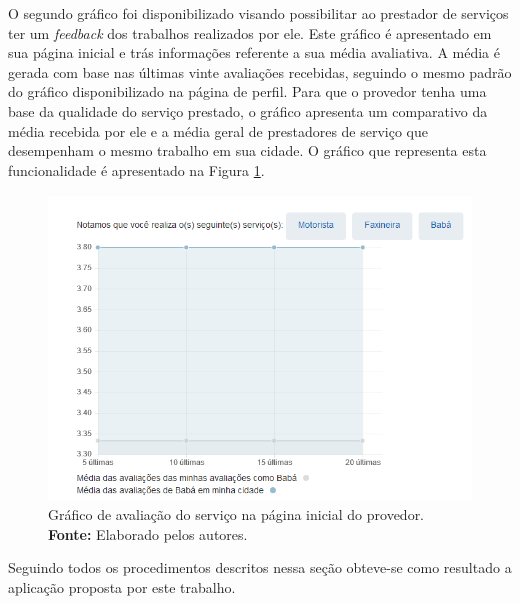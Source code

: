 \par O segundo gráfico foi disponibilizado visando possibilitar ao prestador de serviços ter um \textit{feedback} dos trabalhos realizados por ele. Este gráfico é apresentado em sua página inicial e trás informações referente a sua média avaliativa. A média é gerada com base nas últimas vinte avaliações recebidas, seguindo o mesmo padrão do gráfico disponibilizado na página de perfil. Para que o provedor tenha uma base da qualidade do serviço prestado, o gráfico apresenta um comparativo da média recebida por ele e a média geral de prestadores de serviço que desempenham o mesmo trabalho em sua cidade. O gráfico que representa esta funcionalidade é apresentado na Figura \ref{fig:grafico_pagina_inicial}.

\begin{figure}[h!]
	\centerline{\includegraphics[scale=0.65]{./imagens/grafico-pagina-inicial.png}}
	\caption[Gráfico de avaliação do serviço na página inicial do provedor.]
	{Gráfico de avaliação do serviço na página inicial do provedor. \textbf{Fonte:} Elaborado pelos autores.}
	\label{fig:grafico_pagina_inicial}
\end{figure}



\par Seguindo todos os procedimentos descritos nessa seção obteve-se como resultado a aplicação proposta por este trabalho.